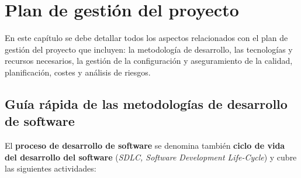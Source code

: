 \chapter{Plan de gestión del proyecto}\label{cap:Planificacion}
En este capítulo se debe detallar todos los aspectos relacionados con el plan de gestión del proyecto que incluyen: la metodología de desarrollo, las tecnologías y recursos necesarios, la gestión de la configuración y aseguramiento de la calidad, planificación, costes y análisis de riesgos.




\section{Guía rápida de las metodologías de desarrollo de software}
El \textbf{proceso de desarrollo de software} se denomina también \textbf{ciclo de vida del desarrollo del software} (\emph{SDLC, Software Development Life-Cycle}) y cubre las siguientes actividades:

